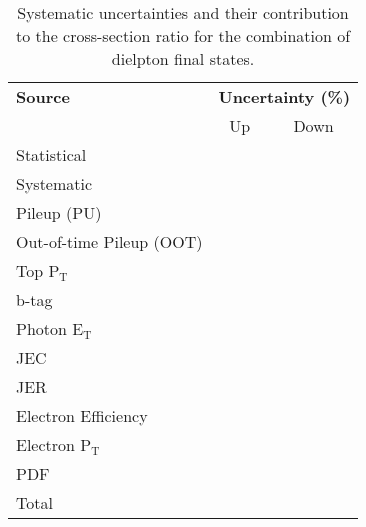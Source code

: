 \begin{table}[h!] 
\centering
\begin{tabular}{|l|c|c|}
\hline
\textbf{Source} & \multicolumn{2}{c|}{\textbf{Uncertainty (\%)}} \\ \cline{2-3}
 & Up & Down \\
\hline
Statistical & & \\
\hline
Systematic & & \\
\hline
Pileup (PU) & & \\
Out-of-time Pileup (OOT) & & \\
Top P$_{\text{T}}$ & & \\
b-tag & & \\
Photon E$_{\text{T}}$ & & \\
JEC & & \\
JER & & \\
Electron Efficiency & & \\
Electron P$_{\text{T}}$ & & \\
PDF & & \\
\hline
Total & & \\
\hline
\end{tabular} 
\caption{Systematic uncertainties and their contribution to the cross-section ratio for the combination of dielpton final states.}
\label{tab-systuncertsCombined}
\end{table}
